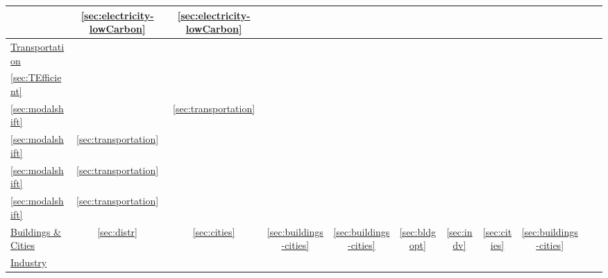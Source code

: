 \begin{table*}[t]
\begin{tabular}{l|cccccccccc}
         & \ref{sec:electricity-lowCarbon} %
         & \ref{sec:electricity-lowCarbon} %
     \\ \hline
         \hyperref[sec:transportation]{\small{Transportation}}
         &%
         \specialcell{\ref{sec:TReducing}\\ \ref{sec:TEfficient}\\ \ref{sec:modalshift}}
         &%
         & \ref{sec:transportation} %
         & \specialcell{\ref{sec:TReducing} \\ \ref{sec:modalshift}} %
         & \ref{sec:transportation} %
         & \specialcell{\ref{sec:TReducing} \\ \ref{sec:modalshift}} %
         & \ref{sec:transportation} %
         &%
         \specialcell{\ref{sec:TReducing}\\ \ref{sec:modalshift}}
         & \ref{sec:transportation} %
         & %
    \\ \hline
         \hyperref[sec:buildings-cities]{\small{Buildings \& Cities}}
         & \ref{sec:distr} %
         & \ref{sec:cities} %
         &\ref{sec:buildings-cities} %
         &\ref{sec:buildings-cities} %
         & \ref{sec:bldgopt} %
         & \ref{sec:indv} %
         & \ref{sec:cities} %
         &
       \ref{sec:buildings-cities} %
         & %
         & %
    \\ \hline
         \hyperref[sec:industry]{\small{Industry}}
         & %

\end{tabular}
\end{table*}
